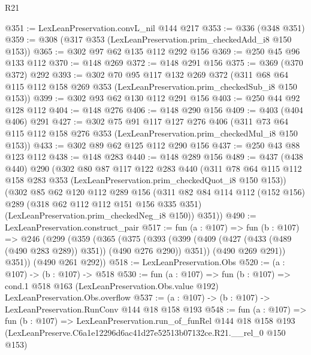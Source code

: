 \begin{lexlean}{R21}
\begin{coremodule}
@351 := LexLeanPreservation.convL_nil @144 @217
@353 := @336 (@348 @351)
@359 := @308 (@317 @353 (LexLeanPreservation.prim_checkedAdd_i8 @150 @153))
@365 := @302 @97 @62 @135 @112 @292 @156
@369 := @250 @45 @96 @133 @112
@370 := @148 @269
@372 := @148 @291 @156
@375 := @369 (@370 @372) @292
@393 := @302
    @70
    @95
    @117
    @132
    @269
    @372
    (@311 @68 @64 @115 @112 @158 @269 @353 (LexLeanPreservation.prim_checkedSub_i8 @150 @153))
@399 := @302 @93 @62 @130 @112 @291 @156
@403 := @250 @44 @92 @128 @112
@404 := @148 @276
@406 := @148 @290 @156
@409 := @403 (@404 @406) @291
@427 := @302
    @75
    @91
    @117
    @127
    @276
    @406
    (@311 @73 @64 @115 @112 @158 @276 @353 (LexLeanPreservation.prim_checkedMul_i8 @150 @153))
@433 := @302 @89 @62 @125 @112 @290 @156
@437 := @250 @43 @88 @123 @112
@438 := @148 @283
@440 := @148 @289 @156
@489 := @437
    (@438 @440)
    @290
    (@302
      @80
      @87
      @117
      @122
      @283
      @440
      (@311 @78 @64 @115 @112 @158 @283 @353 (LexLeanPreservation.prim_checkedQuot_i8 @150 @153))
      (@302
        @85
        @62
        @120
        @112
        @289
        @156
        (@311
          @82
          @84
          @114
          @112
          (@152 @156)
          @289
          (@318 @62 @112 @112 @151 @156 @335 @351)
          (LexLeanPreservation.prim_checkedNeg_i8 @150))
        @351))
@490 := LexLeanPreservation.construct_pair
@517 := fun (a : @107) =>
  fun (b : @107) =>
  @246
    (@299
      (@359
        (@365
          (@375
            (@393 (@399 (@409 (@427 (@433 (@489 (@490 @283 @289)) @351)) (@490 @276 @290)) @351))
            (@490 @269 @291))
          @351))
      (@490 @261 @292))
@518 := LexLeanPreservation.Obs
@520 := (a : @107) -> (b : @107) -> @518
@530 := fun (a : @107) =>
  fun (b : @107) =>
  cond.{1} @518 @163 (LexLeanPreservation.Obs.value @192) LexLeanPreservation.Obs.overflow
@537 := (a : @107) -> (b : @107) -> LexLeanPreservation.RunConv @144 @18 @158 @193
@548 := fun (a : @107) =>
  fun (b : @107) =>
  LexLeanPreservation.run_of_funRel
    @144
    @18
    @158
    @193
    (LexLeanPreserve.C6a1e12296d6ac41d27e52513b07132ce.R21.__rel_0 @150 @153)
\end{coremodule}
\end{lexlean}
